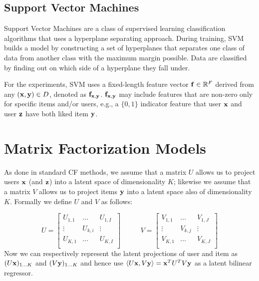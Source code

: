 \subsection{Support Vector Machines}

Support Vector Machines are a class of supervised learning classification algorithms that uses a hyperplane separating approach. During training, SVM builds a model by constructing a set of hyperplanes that separates one class of data from another class with the maximum margin possible. Data are classified by finding out on which side of a hyperplane they fall under.

For the experiments, SVM uses a fixed-length feature vector
$\mathbf{f} \in \mathbb{R}^F$ derived from any $(\mathbf{x},\mathbf{y}) \in D$, denoted
as $\mathbf{f}_{\mathbf{x},\mathbf{y}}$.  $\mathbf{f}_{\mathbf{x},\mathbf{y}}$ may include features
that are non-zero only for specific items and/or users, e.g., a $\{0,1\}$ 
indicator feature that user $\mathbf{x}$
and user $\mathbf{z}$ have both liked item $\mathbf{y}$.  

\section{Matrix Factorization Models}

As done in standard CF methods, we assume that
a matrix $U$ allows us to project users $\mathbf{x}$ (and $\mathbf{z}$)
into a latent space of dimensionality $K$; likewise we assume that
a matrix $V$ allows us to project items $\mathbf{y}$ into a latent
space also of dimensionality $K$.  Formally we define $U$ and $V$
as follows:

\begin{equation*}
U = 
\begin{bmatrix}
  U_{1,1} & \hdots  & U_{1,I} \\
  \vdots  & U_{k,i} & \vdots  \\
  U_{K,1} & \hdots  & U_{K,I} \\
\end{bmatrix}
\qquad \; \; \;
V = 
\begin{bmatrix}
  V_{1,1} & \hdots  & V_{1,J} \\
  \vdots  & V_{k,j} & \vdots  \\
  V_{K,1} & \hdots  & V_{K,J} \\
\end{bmatrix}
\end{equation*}
Now we can respectively represent the latent projections of user and
item as $(U \mathbf{x})_{1 \ldots K}$ and $(V \mathbf{y})_{1 \ldots K}$ and
hence use $\langle U \mathbf{x}, V \mathbf{y} \rangle = \mathbf{x}^T U^T V \mathbf{y}$ as a latent bilinear regressor. 

